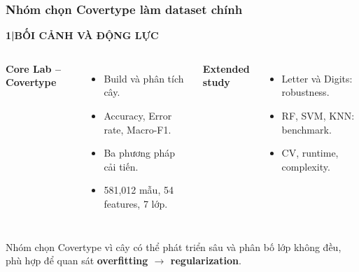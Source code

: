 \documentclass[aspectratio=169,12pt]{beamer}
\newcommand{\chaptertag}[2]{%
  \vspace{-0.16cm}%
  {\scriptsize\bfseries\textcolor{boxframe}{#1\enspace |\enspace #2}}\par
  \vspace{0.12cm}%
}
\begin{document}
\begin{frame}
  \frametitle{Nhóm chọn Covertype làm dataset chính}
  \chaptertag{1}{BỐI CẢNH VÀ ĐỘNG LỰC}
  \begin{columns}[T,onlytextwidth]
      \textbf{Core Lab -- Covertype}
      \begin{itemize}
        \item Build và phân tích cây.
        \item Accuracy, Error rate, Macro-F1.
        \item Ba phương pháp cải tiến.
        \item 581,012 mẫu, 54 features, 7 lớp.
      \end{itemize}
      \textbf{Extended study}
      \begin{itemize}
        \item Letter và Digits: robustness.
        \item RF, SVM, KNN: benchmark.
        \item CV, runtime, complexity.
      \end{itemize}
  \end{columns}
  \vspace{0.35cm}
  \begin{tcolorbox}[focusbox,width=0.91\textwidth,top=2mm,bottom=2mm]
    \centering
    Nhóm chọn Covertype vì cây có thể phát triển sâu và phân bố lớp không đều, phù hợp để quan sát \textbf{overfitting $\rightarrow$ regularization}.
  \end{tcolorbox}
\end{frame}
\end{document}
